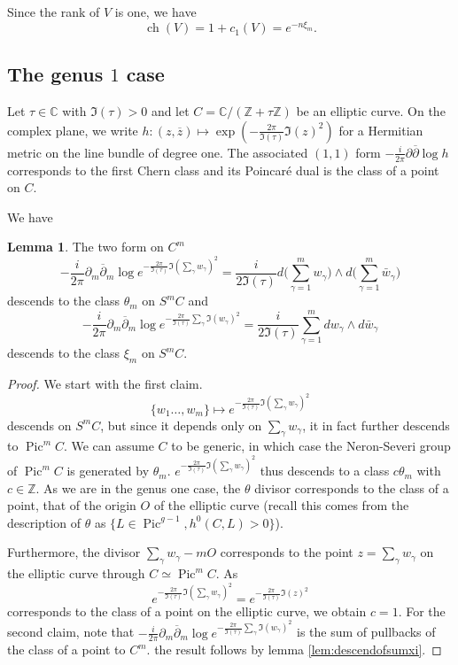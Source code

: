 \documentclass{article}
\theoremstyle{definition}
\newcounter{sharedcounter}[section]
\newtheorem{lemma}[sharedcounter]{Lemma}
\DeclareMathOperator{\pic}{\text{Pic}}
\DeclareMathOperator{\ch}{ch}
\newcommand{\ov}[1]{\overline{#1}}
\begin{document}
Since the rank of $V$ is one, we have 
$$\ch(V)=1+c_1(V)=e^{-n \xi_m}.$$


\subsection{The genus $1$ case}

Let $\tau \in \mathbb{C}$ with $\Im(\tau)>0$ and let $C=\mathbb{C}/({\mathbb{Z}+\tau \mathbb{Z}})$ be an elliptic curve. On the complex plane, we write $h:(z,\ov{z}) \mapsto \exp(-\frac{2\pi}{\Im(\tau)} \Im(z)^2)$ for a Hermitian metric on the line bundle of degree one. The associated $(1,1)$ form $-\frac{i}{2\pi}\partial \ov{\partial} \log h$ corresponds to the first Chern class and its Poincaré dual is the class of a point on $C$. 

We have
\begin{lemma}
\label{lem:repOfThetaAndXiInGenusOne}
The two form on $C^m$
$$-\frac{i}{2\pi}\partial_m \ov{\partial}_m \log e^{-\frac{2\pi}{\Im(\tau)}\Im(\sum_\gamma w_\gamma)^2}=\frac{i}{2\Im(\tau)}d\big(\sum_{\gamma=1}^m w_\gamma\big)\wedge d\big(\sum_{\gamma=1}^m\bar w_\gamma\big)$$ descends to the class $\theta_m$ on $S^mC$ and $$-\frac{i}{2\pi}\partial_m \ov{\partial}_m \log e^{-\frac{2\pi}{\Im(\tau)}\sum_\gamma \Im(w_\gamma)^2}=\frac{i}{2\Im(\tau)}\sum_{\gamma=1}^mdw_\gamma \wedge d\bar w_\gamma$$ descends to the class $\xi_m$ on $S^mC$.
\end{lemma}

\begin{proof}
We start with the first claim.  $$\{ w_1\dots,w_m\} \mapsto e^{-\frac{2\pi}{\Im(\tau)}\Im(\sum_\gamma w_\gamma)^2}$$ descends on $S^mC$, but since it depends only on $\sum_\gamma w_\gamma$, it in fact further descends to $\pic^m{C}$. We can assume $C$ to be generic, in which case the Neron-Severi group of $\pic^m C$ is generated by $\theta_m$. $e^{-\frac{2\pi}{\Im(\tau)}\Im(\sum_\gamma w_\gamma)^2}$ thus descends to a class $c\theta_m$ with $c\in \mathbb{Z}$.
As we are in the genus one case, the $\theta$ divisor corresponds to the class of a point, that of the origin $O$ of the elliptic curve (recall this comes from the description of $\theta$ as $\lbrace L \in \pic^{g-1}, h^0(C,L)>0\rbrace$).
    
Furthermore, the divisor $\sum_\gamma w_\gamma-m O$ corresponds to the point $z=\sum_\gamma w_\gamma$ on the elliptic curve through $C \simeq \pic^m C$. As $$e^{-\frac{2\pi}{\Im(\tau)}\Im(\sum_\gamma w_\gamma)^2}=e^{-\frac{2\pi}{\Im(\tau)}\Im(z)^2}$$ corresponds to the class of a point on the elliptic curve, we obtain $c=1$. 
For the second claim, note that $-\frac{i}{2\pi}\partial_m \ov{\partial}_m \log e^{-\frac{2\pi}{\Im(\tau)}\sum_\gamma \Im(w_\gamma)^2 }$ is the sum of pullbacks of the class of a point to $C^m$. the result follows by lemma \ref{lem:descendofsumxi}.
\end{proof}
\end{document}
